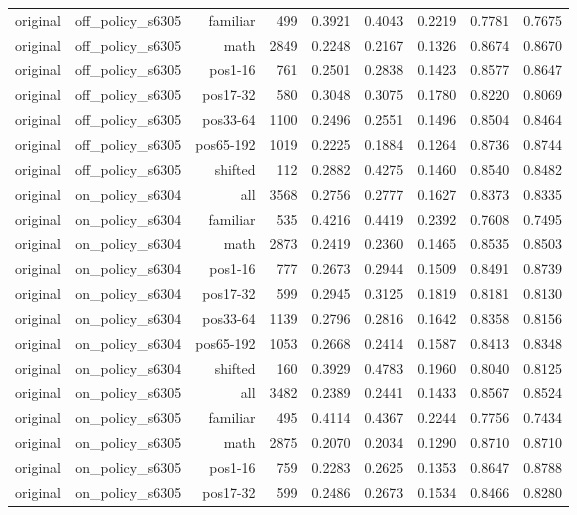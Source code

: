\begin{tabular}{lrrrrrrrr}
original & off\_policy\_s6305 & familiar & 499 & 0.3921 & 0.4043 & 0.2219 & 0.7781 & 0.7675 \\
original & off\_policy\_s6305 & math & 2849 & 0.2248 & 0.2167 & 0.1326 & 0.8674 & 0.8670 \\
original & off\_policy\_s6305 & pos1-16 & 761 & 0.2501 & 0.2838 & 0.1423 & 0.8577 & 0.8647 \\
original & off\_policy\_s6305 & pos17-32 & 580 & 0.3048 & 0.3075 & 0.1780 & 0.8220 & 0.8069 \\
original & off\_policy\_s6305 & pos33-64 & 1100 & 0.2496 & 0.2551 & 0.1496 & 0.8504 & 0.8464 \\
original & off\_policy\_s6305 & pos65-192 & 1019 & 0.2225 & 0.1884 & 0.1264 & 0.8736 & 0.8744 \\
original & off\_policy\_s6305 & shifted & 112 & 0.2882 & 0.4275 & 0.1460 & 0.8540 & 0.8482 \\
original & on\_policy\_s6304 & all & 3568 & 0.2756 & 0.2777 & 0.1627 & 0.8373 & 0.8335 \\
original & on\_policy\_s6304 & familiar & 535 & 0.4216 & 0.4419 & 0.2392 & 0.7608 & 0.7495 \\
original & on\_policy\_s6304 & math & 2873 & 0.2419 & 0.2360 & 0.1465 & 0.8535 & 0.8503 \\
original & on\_policy\_s6304 & pos1-16 & 777 & 0.2673 & 0.2944 & 0.1509 & 0.8491 & 0.8739 \\
original & on\_policy\_s6304 & pos17-32 & 599 & 0.2945 & 0.3125 & 0.1819 & 0.8181 & 0.8130 \\
original & on\_policy\_s6304 & pos33-64 & 1139 & 0.2796 & 0.2816 & 0.1642 & 0.8358 & 0.8156 \\
original & on\_policy\_s6304 & pos65-192 & 1053 & 0.2668 & 0.2414 & 0.1587 & 0.8413 & 0.8348 \\
original & on\_policy\_s6304 & shifted & 160 & 0.3929 & 0.4783 & 0.1960 & 0.8040 & 0.8125 \\
original & on\_policy\_s6305 & all & 3482 & 0.2389 & 0.2441 & 0.1433 & 0.8567 & 0.8524 \\
original & on\_policy\_s6305 & familiar & 495 & 0.4114 & 0.4367 & 0.2244 & 0.7756 & 0.7434 \\
original & on\_policy\_s6305 & math & 2875 & 0.2070 & 0.2034 & 0.1290 & 0.8710 & 0.8710 \\
original & on\_policy\_s6305 & pos1-16 & 759 & 0.2283 & 0.2625 & 0.1353 & 0.8647 & 0.8788 \\
original & on\_policy\_s6305 & pos17-32 & 599 & 0.2486 & 0.2673 & 0.1534 & 0.8466 & 0.8280 \\

\end{tabular}
